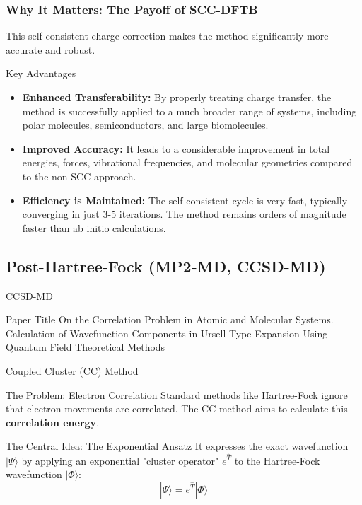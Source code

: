\begin{frame}
  \frametitle{Why It Matters: The Payoff of SCC-DFTB}
  
  This self-consistent charge correction makes the method significantly more accurate and robust. \pause
  
  \begin{alertblock}{Key Advantages}
    \begin{itemize}
      \item \textbf{Enhanced Transferability:} By properly treating charge transfer, the method is successfully applied to a much broader range of systems, including polar molecules, semiconductors, and large biomolecules. \pause
      
      \item \textbf{Improved Accuracy:} It leads to a considerable improvement in total energies, forces, vibrational frequencies, and molecular geometries compared to the non-SCC approach. \pause
      
      \item \textbf{Efficiency is Maintained:} The self-consistent cycle is very fast, typically converging in just 3-5 iterations. The method remains orders of magnitude faster than ab initio calculations.
    \end{itemize}
  \end{alertblock}
  
\end{frame}

\subsection{Post-Hartree-Fock (MP2-MD, CCSD-MD)}


\begin{frame}{CCSD-MD}
	\begin{block}{Paper Title}
	On the Correlation Problem in Atomic and Molecular Systems. Calculation of Wavefunction Components in Ursell-Type Expansion Using Quantum Field Theoretical Methods 
	\end{block}
\end{frame}


\begin{frame}{Coupled Cluster (CC) Method}
    \begin{block}{The Problem: Electron Correlation}
        Standard methods like Hartree-Fock ignore that electron movements are correlated. The CC method aims to calculate this \textbf{correlation energy}.
    \end{block}
    \pause

    \begin{alertblock}{The Central Idea: The Exponential Ansatz}
        It expresses the exact wavefunction $|\Psi\rangle$ by applying an exponential "cluster operator" $e^{\hat{T}}$ to the Hartree-Fock wavefunction $|\Phi\rangle$:
        \[
        |\Psi\rangle = e^{\hat{T}} |\Phi\rangle
        \]
    \end{alertblock}
\end{frame}

